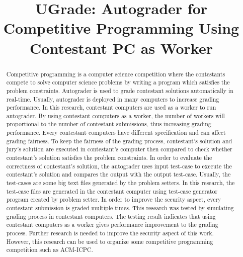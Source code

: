 \documentclass[conference,a4paper]{IEEEtran}
\begin{document}
\title{UGrade: Autograder for Competitive Programming Using Contestant PC as Worker}

\author{
    \and
}

\maketitle

\begin{abstract}
Competitive programming is a computer science competition where the contestants compete to solve computer science problems by writing a program which satisfies the problem constraints. Autograder is used to grade contestant solutions automatically in real-time. Usually, autograder is deployed in many computers to increase grading performance. In this research, contestant computers are used as a worker to run autograder. By using contestant computers as a worker, the number of workers will proportional to the number of contestant submissions, thus increasing grading performance. Every contestant computers have different specification and can affect grading fairness. To keep the fairness of the grading process, contestant's solution and jury's solution are executed in contestant's computer then compared to check whether contestant's solution satisfies the problem constraints. In order to evaluate the correctness of contestant's solution, the autograder uses input test-case to execute the contestant's solution and compares the output with the output test-case. Usually, the test-cases are some big text files generated by the problem setters. In this research, the test-case files are generated in the contestant computer using test-case generator program created by problem setter. In order to improve the security aspect, every contestant submission is graded multiple times. This research was tested by simulating grading process in contestant computers. The testing result indicates that using contestant computers as a worker gives performance improvement to the grading process. Further research is needed to improve the security aspect of this work. However, this research can be used to organize some competitive programming competition such as ACM-ICPC.
\end{abstract}
\end{document}

